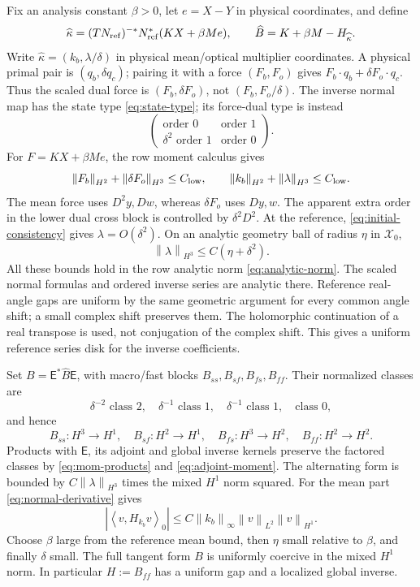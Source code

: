 \documentclass[11pt,a4paper]{article}
\numberwithin{equation}{section}
\theoremstyle{remark}
\newcommand{\norm}[1]{\left\lVert #1\right\rVert}
\newcommand{\ip}[2]{\left\langle #1,#2\right\rangle_0}
\newcommand{\Graph}{\mathsf E}
\newcommand{\Xzero}{\mathcal X_0}
\begin{document}
Fix an analysis constant \(\beta>0\), let \(e=X-Y\) in physical
coordinates, and define
\begin{equation}\label{eq:geometric-force}
 \widehat\kappa=(TN_{\rm ref})^{-*}N_{\rm ref}^*(KX+\beta Me),
 \qquad \widehat B=K+\beta M-H_{\widehat\kappa}.
\end{equation}
Write \(\widehat\kappa=(k_b,\lambda/\delta)\) in physical
mean/optical multiplier coordinates. A physical primal pair is
\((q_b,\delta q_c)\); pairing it with a force \((F_b,F_o)\) gives
\(F_b\cdot q_b+\delta F_o\cdot q_c\). Thus the scaled dual force is
\((F_b,\delta F_o)\), not \((F_b,F_o/\delta)\).
The inverse normal map has the state type \eqref{eq:state-type}; its force-dual type is instead
\[
 \begin{pmatrix}\text{order }0&\text{order }1\\
          \delta^2\text{ order }1&\text{order }0\end{pmatrix}.
\]
For \(F=KX+\beta Me\), the row moment calculus gives
\[
 \norm{F_b}_{H^2}+\norm{\delta F_o}_{H^3}\leq C_{\rm low},
 \qquad
 \norm{k_b}_{H^2}+\norm\lambda_{H^3}\leq C_{\rm low}.
\]
The mean force uses \(D^2y,Dw\), whereas \(\delta F_o\) uses
\(Dy,w\). The apparent extra order in the lower dual cross block
is controlled by \(\delta^2D^2\). At the reference,
\eqref{eq:initial-consistency} gives \(\lambda=O(\delta^2)\).
On an analytic geometry ball of radius \(\eta\) in \(\Xzero\),
\begin{equation}\label{eq:lambda-small}
                 \norm\lambda_{H^3}\leq C(\eta+\delta^2).
\end{equation}
All these bounds hold in the row analytic norm \eqref{eq:analytic-norm}.
The scaled normal formulas and ordered inverse series are analytic
there. Reference real-angle gaps are uniform by the same geometric
argument for every common angle shift; a small complex shift
preserves them. The holomorphic continuation of a real transpose
is used, not conjugation of the complex shift. This gives a uniform
reference series disk for the inverse coefficients.

Set \(B=\Graph^*\widehat B\Graph\), with macro/fast blocks
\(B_{ss},B_{sf},B_{fs},B_{ff}\). Their normalized classes are
\[
 \delta^{-2}\text{ class }2,\quad
 \delta^{-1}\text{ class }1,\quad
 \delta^{-1}\text{ class }1,\quad
 \text{class }0 ,
\]
and hence
\[
 B_{ss}:H^3\to H^1,\quad B_{sf}:H^2\to H^1,\quad
 B_{fs}:H^3\to H^2,\quad B_{ff}:H^2\to H^2.
\]
Products with \(\Graph\), its adjoint and global inverse kernels
preserve the factored classes by \eqref{eq:mom-products} and
\eqref{eq:adjoint-moment}. The alternating form is bounded by
\(C\norm\lambda_{H^3}\) times the mixed \(H^1\) norm squared.
For the mean part \eqref{eq:normal-derivative} gives
\[
 |\ip v{H_{k_b}v}|
     \leq C\norm{k_b}_\infty\norm v_{L^2}\norm v_{H^1}.
\]
Choose \(\beta\) large from the reference mean bound, then \(\eta\)
small relative to \(\beta\), and finally \(\delta\) small. The full
tangent form \(B\) is uniformly coercive in the mixed \(H^1\) norm.
In particular \(H:=B_{ff}\) has a uniform gap and a localized
global inverse.
\end{document}

